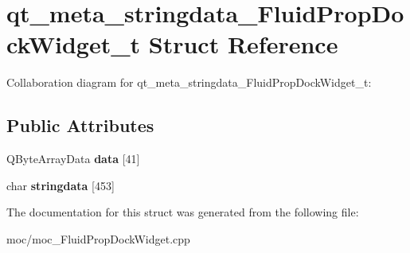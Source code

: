 \hypertarget{structqt__meta__stringdata___fluid_prop_dock_widget__t}{\section{qt\-\_\-meta\-\_\-stringdata\-\_\-\-Fluid\-Prop\-Dock\-Widget\-\_\-t Struct Reference}
\label{structqt__meta__stringdata___fluid_prop_dock_widget__t}
}


Collaboration diagram for qt\-\_\-meta\-\_\-stringdata\-\_\-\-Fluid\-Prop\-Dock\-Widget\-\_\-t\-:
\subsection*{Public Attributes}
\begin{DoxyCompactItemize}
\item 
\hypertarget{structqt__meta__stringdata___fluid_prop_dock_widget__t_a4ec27da0a498540f17a8b4012ba7010a}{Q\-Byte\-Array\-Data {\bfseries data} \mbox{[}41\mbox{]}}\label{structqt__meta__stringdata___fluid_prop_dock_widget__t_a4ec27da0a498540f17a8b4012ba7010a}

\item 
\hypertarget{structqt__meta__stringdata___fluid_prop_dock_widget__t_a853bb9fbb11a9682d7c74ce25980bf6c}{char {\bfseries stringdata} \mbox{[}453\mbox{]}}\label{structqt__meta__stringdata___fluid_prop_dock_widget__t_a853bb9fbb11a9682d7c74ce25980bf6c}

\end{DoxyCompactItemize}


The documentation for this struct was generated from the following file\-:\begin{DoxyCompactItemize}
\item 
moc/moc\-\_\-\-Fluid\-Prop\-Dock\-Widget.\-cpp\end{DoxyCompactItemize}
